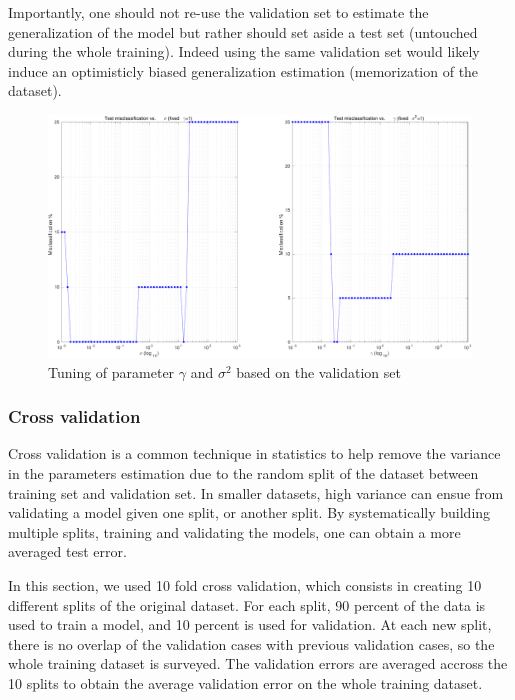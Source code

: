 \documentclass[11pt, a4paper]{article}
\begin{document}
Importantly, one should not re-use the validation set to estimate the
generalization of the model but rather should set aside a test set
(untouched during the whole training). Indeed using the same
validation set would likely induce an optimisticly biased
generalization estimation (memorization of the dataset).

\begin{figure}[H]
    \centering
    \includegraphics[scale=.40]{hyperparams_choice1.pdf}
    \caption{Tuning of parameter $\gamma$ and $\sigma^2$ based on the
      validation set}
    \label{fig:hyperparams_choice1}
\end{figure}

\subsubsection{Cross validation}

Cross validation is a common technique in statistics to help remove
the variance in the parameters estimation due to the random split of
the dataset between training set and validation set. In smaller
datasets, high variance can ensue from validating a model given one
split, or another split. By systematically building multiple splits,
training and validating the models, one can obtain a more averaged test
error.

In this section, we used 10 fold cross validation, which consists in
creating 10 different splits of the original dataset. For each split,
90 percent of the data is used to train a model, and 10 percent is
used for validation. At each new split, there is no overlap of the
validation cases with previous validation cases, so the whole training
dataset is surveyed. The validation errors are averaged accross the 10
splits to obtain the average validation error on the whole training
dataset.
\end{document}
